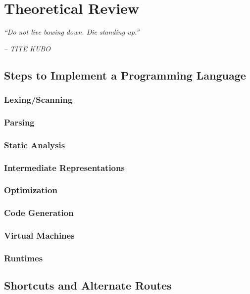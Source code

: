 \chapter{Theoretical Review} \label{Cap:theoretical_review}

\begin{displayquote}
    \begin{center}
        \textit{``Do not live bowing down. Die standing up.''}
    \end{center}
\end{displayquote}

\begin{flushright}
   \textit{-- TITE KUBO}
\end{flushright}

\section{Steps to Implement a Programming Language}

\subsection{Lexing/Scanning}
\subsection{Parsing}
\subsection{Static Analysis}
\subsection{Intermediate Representations}
\subsection{Optimization}
\subsection{Code Generation}
\subsection{Virtual Machines}
\subsection{Runtimes}

\section{Shortcuts and Alternate Routes}
